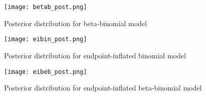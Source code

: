\begin{figure}
  \texttt{[image: betab\_post.png]}
  \caption{Posterior distribution for beta-binomial model}
  \label{fig:post-betab}
\end{figure}

\begin{figure}
  \texttt{[image: eibin\_post.png]}
  \caption{Posterior distribution for endpoint-inflated binomial model}
  \label{fig:post-eibin}
\end{figure}

\begin{figure}
  \texttt{[image: eibeb\_post.png]}
  \caption{Posterior distribution for endpoint-inflated beta-binomial model}
  \label{fig:post-eibeb}
\end{figure}


